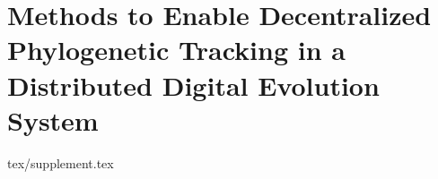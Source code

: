 \chapter{Methods to Enable Decentralized Phylogenetic Tracking in a Distributed Digital Evolution System}
\label{ch:conduit-appendix}

{tex/supplement.tex}

